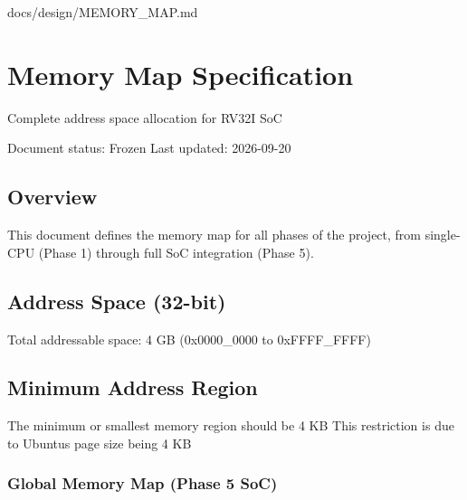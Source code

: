 \begin{relocated}{docs/design/MEMORY_MAP.md}
\section{Memory Map Specification}\label{ds:mm:memory-map}

Complete address space allocation for RV32I SoC

Document status: Frozen Last updated: 2026-09-20

\subsection{Overview}\label{ds:mm:memory-map:overview}

This document defines the memory map for all phases of the project, from
single-CPU (Phase 1) through full SoC integration (Phase 5).

\subsection{Address Space (32-bit)}\label{ds:mm:memory-map:address-space-32-bit}

Total addressable space: 4 GB (0x0000\_\allowbreak{}0000 to
0xFFFF\_\allowbreak{}FFFF)

\subsection{Minimum Address Region}\label{ds:mm:memory-map:minimum-address-region}

The minimum or smallest memory region should be 4 KB This restriction is
due to Ubuntu\textquotesingle s page size being 4 KB

\subsubsection{Global Memory Map (Phase 5 SoC)}\label{ds:mm:memory-map:global-memory-map-phase-5-soc}

{\small\setlength{\tabcolsep}{4pt}

}
\end{relocated}
